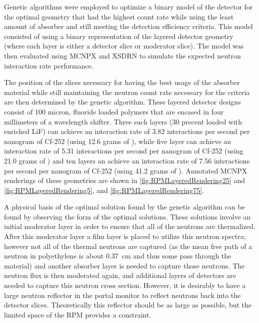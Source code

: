 Genetic algorithms were employed to optimize a binary model of the detector for the optimal geometry that had the highest count rate while using the least amount of absorber and still meeting the detection efficiency criteria.
This model consisted of using a binary representation of the layered detector geometry (where each layer is either a detector slice or moderator slice).
The model was then evaluated using MCNPX and XSDRN to simulate the expected neutron interaction rate performance.

The position of the slices necessary for having the best usage of the absorber material while still maintaining the neutron count rate necessary for the criteria are then determined by the genetic algorithm.
These layered detector designs consist of 100 micron,  fluoride loaded polymers that are encased in four millimeters of a wavelength shifter.
Three such layers (30 precent loaded with enriched LiF) can achieve an interaction rate of 3.82 interactions per second per nanogram of Cf-252 (using 12.6 grams of ), while five layer can achieve an interaction rate of 5.31 interactions per second per nanogram of Cf-252 (using 21.0 grams of )  and ten layers an achieve an interaction rate of 7.56 interactions per second per nanogram of Cf-252 (using 41.2 grams of ).
Annotated MCNPX renderings of these geometries are shown in \autoref{fig:RPMLayeredRendering25} and \autoref{fig:RPMLayeredRendering5}, and \autoref{fig:RPMLayeredRendering75}.

A physical basis of the optimal solution found by the genetic algorithm can be found by observing the form of the optimal solutions.
These solutions involve an initial moderator layer in order to ensure that all of the neutrons are thermalized.
After this moderator layer a film layer is placed to utilize this neutron spectra; however not all of the thermal neutrons are captured (as the mean free path of a neutron in polyethylene is about \SI{0.37}{\cm} and thus some pass through the material) and another absorber layer is needed to capture those neutrons.  
The neutron flux is then moderated again, and additional layers of detectors are needed to capture this neutron cross section.
However, it is desirably to have a large neutron reflector in the portal monitor to reflect neutrons back into the detector slices. 
Theoretically this reflector should be as large as possible, but the limited space of the RPM provides a constraint.

